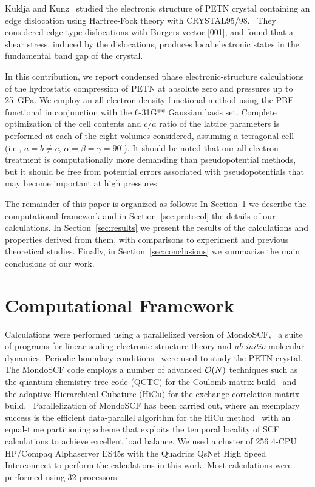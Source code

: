\documentclass[prb,aps,nobibnotes,superbib,preprint]{revtex4}
\begin{document}
Kuklja and Kunz~\cite{Kuklja_2001v89} studied the electronic structure 
of PETN crystal containing an edge dislocation using Hartree-Fock
theory with CRYSTAL95/98.~\cite{Crystal95} They considered
edge-type dislocations with Burgers vector [001], and 
found that a shear stress, induced by the dislocations, produces local 
electronic states in the fundamental band gap of the crystal.

In this contribution, we report condensed phase electronic-structure
calculations of the hydrostatic compression of PETN at absolute zero
and pressures up to 25~GPa.  We employ an all-electron
density-functional method using the PBE~\cite{Perdew_96v77} functional
in conjunction with the 6-31G** Gaussian basis set.  Complete
optimization of the cell contents and $c/a$ ratio of the lattice
parameters is performed at each of the eight volumes considered,
assuming a tetragonal cell (i.e., $a=b \neq c$,
$\alpha=\beta=\gamma=90^\circ$).  It should be noted that our
all-electron treatment is computationally more demanding than
pseudopotential methods, but it should be free from potential errors
associated with pseudopotentials that may become important at high
pressures.

The remainder of this paper is organized as follows: In
Section~\ref{sec:comput} we describe the computational framework and
in Section~\ref{sec:protocol} the details of our calculations. In
Section~\ref{sec:results} we present the results of the calculations
and properties derived from them, with comparisons to experiment and
previous theoretical studies.  Finally, in
Section~\ref{sec:conclusions} we summarize the main conclusions of our
work.

\section{Computational Framework}
\label{sec:comput}
Calculations were performed using a parallelized version of
MondoSCF,~\cite{MondoSCF} a suite of programs for linear scaling
electronic-structure theory and {\it ab initio} molecular dynamics.
Periodic boundary conditions~\cite{CTymczak03} were used to study the
PETN crystal.  The MondoSCF code employs a number of advanced ${\cal O}(N)$
techniques such as the quantum chemistry tree code (QCTC) for the
Coulomb matrix
build~\cite{MChallacombe96,MChallacombe96B,MChallacombe97} and the
adaptive Hierarchical Cubature (HiCu) for the exchange-correlation
matrix build.~\cite{MChallacombe00A} Parallelization of MondoSCF has
been carried out, where an exemplary success is the efficient
data-parallel algorithm for the HiCu method~\cite{CGan03} with an
equal-time partitioning scheme that exploits the temporal locality of
SCF calculations to achieve excellent load balance.  
We used a cluster of 256 4-CPU HP/Compaq Alphaserver ES45s with the Quadrics 
QsNet High Speed Interconnect to perform the calculations in this work.  
Most calculations were performed using 32 processors.
\end{document}
